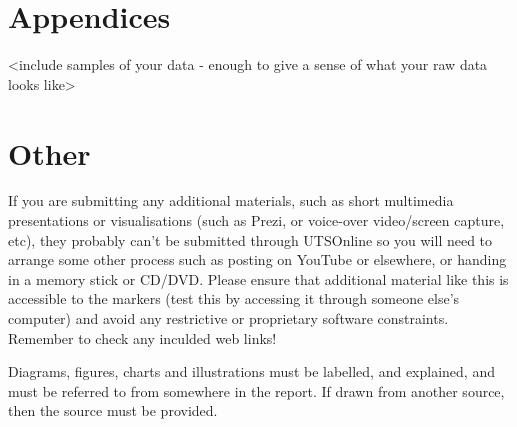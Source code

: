 \documentclass[
]{article}
\begin{document}
\hypertarget{appendices}{%
\section{Appendices}\label{appendices}}

\textless include samples of your data - enough to give a sense of what
your raw data looks like\textgreater{}

\hypertarget{other}{%
\section{Other}\label{other}}

If you are submitting any additional materials, such as short multimedia
presentations or visualisations (such as Prezi, or voice-over
video/screen capture, etc), they probably can't be submitted through
UTSOnline so you will need to arrange some other process such as posting
on YouTube or elsewhere, or handing in a memory stick or CD/DVD. Please
ensure that additional material like this is accessible to the markers
(test this by accessing it through someone else's computer) and avoid
any restrictive or proprietary software constraints. Remember to check
any inculded web links!

Diagrams, figures, charts and illustrations must be labelled, and
explained, and must be referred to from somewhere in the report. If
drawn from another source, then the source must be provided.
\end{document}
